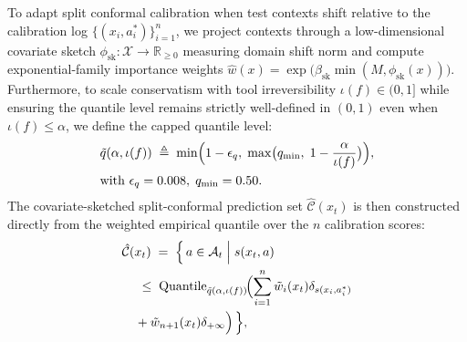 \documentclass[11pt]{article}
\begin{document}
To adapt split conformal calibration \citep{vovk2005conformal, ren2023knowno} when test contexts shift relative to the calibration log $\{(x_i,\allowbreak a_i^*)\}_{i=1}^{n}$, we project contexts through a low-dimensional covariate sketch $\phi_{\mathrm{sk}}: \mathcal{X} \allowbreak \to \mathbb{R}_{\ge 0}$ measuring domain shift norm and compute exponential-family importance weights $\hat{w}(x) = \exp\bigl(\beta_{\mathrm{sk}} \min(M,\allowbreak \phi_{\mathrm{sk}}(x))\bigr)$. Furthermore, to scale conservatism with tool irreversibility $\iota(f) \in (0,\allowbreak 1]$ while ensuring the quantile level remains strictly well-defined in $(0, 1)$ even when $\iota(f) \le \alpha$, we define the capped quantile level:
\begin{equation}
\begin{aligned}
&\tilde{q}(\alpha, \iota(f)) \;\triangleq\; \min\Bigl(1 - \epsilon_q,\; \max\bigl(q_{\min},\; 1 - \frac{\alpha}{\iota(f)}\bigr)\Bigr), \\
&\text{with } \epsilon_q = 0.008,\; q_{\min} = 0.50.
\end{aligned}
\label{eq:capped_level}
\end{equation}
The covariate-sketched split-conformal prediction set $\hat{\mathcal{C}}(x_t)$ is then constructed directly from the weighted empirical quantile over the $n$ calibration scores:
\begin{equation}
\begin{aligned}
&\hat{\mathcal{C}}(x_t) \;=\; \Bigl\{\, a \in \mathcal{A}_t \;\Big|\; s(x_t, a) \\
&\quad \;\le\; \mathrm{Quantile}_{\tilde{q}(\alpha, \iota(f))}\!\Bigl(\sum_{i=1}^{n} \tilde{w}_i(x_t) \delta_{s(x_i, a_i^*)} \\
&\quad + \tilde{w}_{n+1}(x_t) \delta_{+\infty}\Bigr) \,\Bigr\},
\end{aligned}
\label{eq:sketched_cp}
\end{equation}
\end{document}
